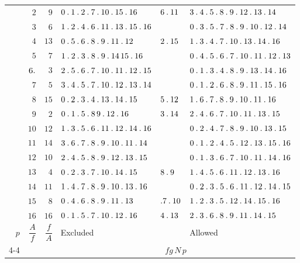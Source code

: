 \begin{longtable}{r|r|r|p{113pt}|p{29pt}|p{120pt}}
 & $2$ & $9$ & $0\pdot 1\pdot 2\pdot 7\pdot 10\pdot 15\pdot 16$ & $6\pdot 11$ & $3\pdot 4\pdot 5\pdot 8\pdot 9\pdot 12\pdot 13\pdot 14$\\
 & $3$ & $6$ & $1\pdot 2\pdot 4\pdot 6\pdot 11\pdot 13\pdot 15\pdot 16$ &  & $0\pdot 3\pdot 5\pdot 7\pdot 8\pdot 9\pdot 10\pdot 12\pdot 14$\\
 & $4$ & $13$ & $0\pdot 5\pdot 6\pdot 8\pdot 9\pdot 11\pdot 12$ & $2\pdot 15$ & $1\pdot 3\pdot 4\pdot 7\pdot 10\pdot 13\pdot 14\pdot 16$\\
 & $5$ & $7$ & $1\pdot 2\pdot 3\pdot 8\pdot 9\pdot 14\,15\pdot 16$ &  & $0\pdot 4\pdot 5\pdot 6\pdot 7\pdot 10\pdot 11\pdot 12\pdot 13$\\
 & $6\pdot $ & $3$ & $2\pdot 5\pdot 6\pdot 7\pdot 10\pdot 11\pdot 12\pdot 15$ &  & $0\pdot 1\pdot 3\pdot 4\pdot 8\pdot 9\pdot 13\pdot 14\pdot 16$\\
 & $7$ & $5$ & $3\pdot 4\pdot 5\pdot 7\pdot 10\pdot 12\pdot 13\pdot 14$ &  & $0\pdot 1\pdot 2\pdot 6\pdot 8\pdot 9\pdot 11\pdot 15\pdot 16$\\
 & $8$ & $15$ & $0\pdot 2\pdot 3\pdot 4\pdot 13\pdot 14\pdot 15$ & $5\pdot 12$ & $1\pdot 6\pdot 7\pdot 8\pdot 9\pdot 10\pdot 11\pdot 16$\\
 & $9$ & $2$ & $0\pdot 1\pdot 5\pdot 8\,9\pdot 12\pdot 16$ & $3\pdot 14$ & $2\pdot 4\pdot 6\pdot 7\pdot 10\pdot 11\pdot 13\pdot 15$\\
 & $10$ & $12$ & $1\pdot 3\pdot 5\pdot 6\pdot 11\pdot 12\pdot 14\pdot 16$ &  & $0\pdot 2\pdot 4\pdot 7\pdot 8\pdot 9\pdot 10\pdot 13\pdot 15$\\
 & $11$ & $14$ & $3\pdot 6\pdot 7\pdot 8\pdot 9\pdot 10\pdot 11\pdot 14$ &  & $0\pdot 1\pdot 2\pdot 4\pdot 5\pdot 12\pdot 13\pdot 15\pdot 16$\\
 & $12$ & $10$ & $2\pdot 4\pdot 5\pdot 8\pdot 9\pdot 12\pdot 13\pdot 15$ &  & $0\pdot 1\pdot 3\pdot 6\pdot 7\pdot 10\pdot 11\pdot 14\pdot 16$\\
 & $13$ & $4$ & $0\pdot 2\pdot 3\pdot 7\pdot 10\pdot 14\pdot 15$ & $8\pdot 9$ & $1\pdot 4\pdot 5\pdot 6\pdot 11\pdot 12\pdot 13\pdot 16$\\
 & $14$ & $11$ & $1\pdot 4\pdot 7\pdot 8\pdot 9\pdot 10\pdot 13\pdot 16$ &  & $0\pdot 2\pdot 3\pdot 5\pdot 6\pdot 11\pdot 12\pdot 14\pdot 15$\\
 & $15$ & $8$ & $0\pdot 4\pdot 6\pdot 8\pdot 9\pdot 11\pdot 13$ & $\pdot 7\pdot 10$ & $1\pdot 2\pdot 3\pdot 5\pdot 12\pdot 14\pdot 15\pdot 16$\\
 & $16$ & $16$ & $0\pdot 1\pdot 5\pdot 7\pdot 10\pdot 12\pdot 16$ & $4\pdot 13$ & $2\pdot 3\pdot 6\pdot 8\pdot 9\pdot 11\pdot 14\pdot 15$\\
\hline
$p$ & $\dfrac{A}{f}$ & $\dfrac{f}{A}$ & Excluded & & Allowed\\\cline{4-4}\cline{6-6}
& & & \multicolumn{3}{c}{$fg\,N\,p$}\\
\end{longtable}\endgroup
